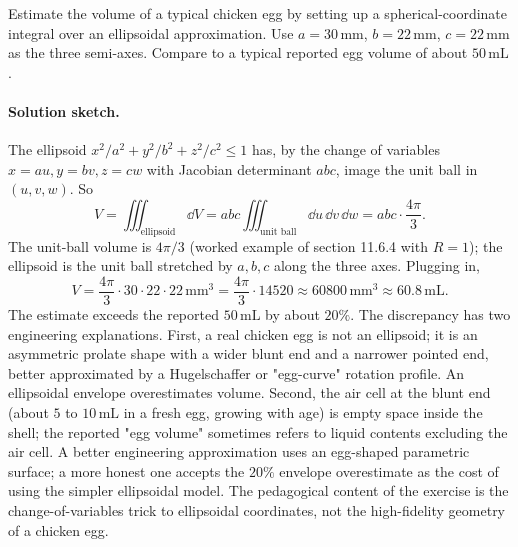 \begin{exercise}
Estimate the volume of a typical chicken egg by setting up a
spherical-coordinate integral over an ellipsoidal approximation. Use
$a = 30\,\si{\milli\meter}$, $b = 22\,\si{\milli\meter}$,
$c = 22\,\si{\milli\meter}$ as the three semi-axes. Compare to a
typical reported egg volume of about $50\,\si{\milli\liter}$.

\paragraph{Solution sketch.} The ellipsoid $x^{2}/a^{2} + y^{2}/b^{
2} + z^{2}/c^{2} \leq 1$ has, by the change of variables $x = a u,
y = b v, z = c w$ with Jacobian determinant $abc$, image the unit
ball in $(u, v, w)$. So
\[
V = \iiint_{\text{ellipsoid}} \dd V = abc \iiint_{\text{unit ball}}
\dd u\,\dd v\,\dd w = abc \cdot \frac{4\pi}{3}.
\]
The unit-ball volume is $4\pi/3$ (worked example of section 11.6.4
with $R = 1$); the ellipsoid is the unit ball stretched by $a, b,
c$ along the three axes. Plugging in,
\[
V = \frac{4\pi}{3} \cdot 30 \cdot 22 \cdot 22\,\si{\milli\meter
\cubed} = \frac{4\pi}{3} \cdot 14520 \approx 60800\,\si{\milli\meter
\cubed} \approx 60.8\,\si{\milli\liter}.
\]
The estimate exceeds the reported $50\,\si{\milli\liter}$ by about
$20\%$. The discrepancy has two engineering explanations. First, a
real chicken egg is not an ellipsoid; it is an asymmetric prolate
shape with a wider blunt end and a narrower pointed end, better
approximated by a Hugelschaffer or "egg-curve" rotation profile. An
ellipsoidal envelope overestimates volume. Second, the air cell at
the blunt end (about $5$ to $10\,\si{\milli\liter}$ in a fresh egg,
growing with age) is empty space inside the shell; the reported
"egg volume" sometimes refers to liquid contents excluding the air
cell. A better engineering approximation uses an egg-shaped
parametric surface; a more honest one accepts the $20\%$ envelope
overestimate as the cost of using the simpler ellipsoidal model.
The pedagogical content of the exercise is the change-of-variables
trick to ellipsoidal coordinates, not the high-fidelity geometry of
a chicken egg.
\end{exercise}

